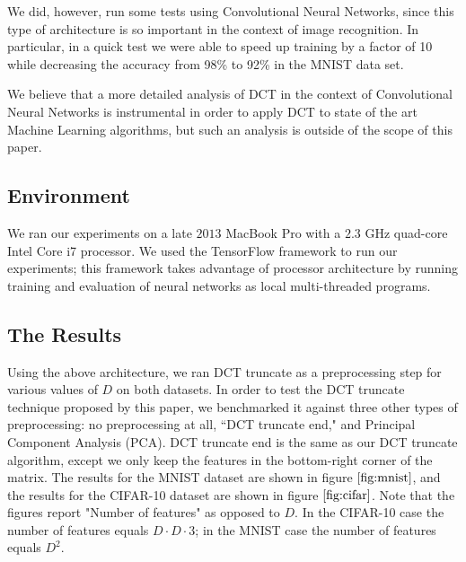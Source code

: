 \documentclass[12pt]{article}
\begin{document}
We did, however, run some tests using Convolutional Neural Networks, since this type of architecture is so important in the context of image recognition. In particular, in a quick test we were able to speed up training by a factor of 10 while decreasing the accuracy from 98\% to 92\% in the MNIST data set.

We believe that a more detailed analysis of DCT in the context of Convolutional Neural Networks is instrumental in order to apply DCT to state of the art Machine Learning algorithms, but such an analysis is outside of the scope of this paper.

\subsection{Environment}

We ran our experiments on a late $2013$ MacBook Pro with a $2.3$ GHz quad-core Intel Core i7 processor.  We used the TensorFlow \cite{tensorflow} framework to run our experiments; this framework takes advantage of processor architecture by running training and evaluation of neural networks as local multi-threaded programs.

\subsection{The Results}

Using the above architecture, we ran DCT truncate as a preprocessing step for various values of $D$ on both datasets.  In order to test the DCT truncate technique proposed by this paper, we benchmarked it against three other types of preprocessing: no preprocessing at all, ``DCT truncate end," and Principal Component Analysis (PCA).  DCT truncate end is the same as our DCT truncate algorithm, except we only keep the features in the bottom-right corner of the matrix.  The results for the MNIST dataset are shown in figure $\ref{fig:mnist}$, and the results for the CIFAR-10 dataset are shown in figure $\ref{fig:cifar}$.  Note that the figures report "Number of features" as opposed to $D$. In the CIFAR-10 case the number of features equals $D \cdot D \cdot 3$; in the MNIST case the number of features equals $D^2$.
\end{document}
